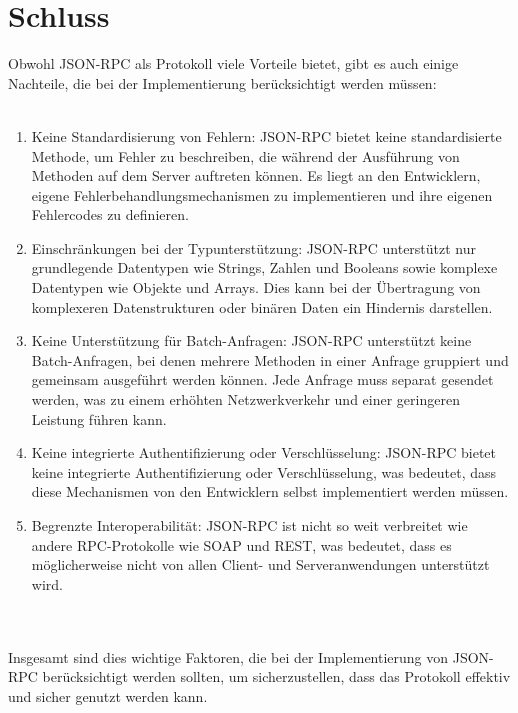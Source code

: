 \documentclass[german,oneside,color]{htldipl}
\begin{document}
\chapter{Schluss}
Obwohl JSON-RPC als Protokoll viele Vorteile bietet, gibt es auch einige Nachteile, die bei der Implementierung berücksichtigt werden müssen:
\\
\\
\begin{enumerate}
    \item Keine Standardisierung von Fehlern: JSON-RPC bietet keine standardisierte Methode, um Fehler zu beschreiben, die während der Ausführung von Methoden auf dem Server auftreten können. Es liegt an den Entwicklern, eigene Fehlerbehandlungsmechanismen zu implementieren und ihre eigenen Fehlercodes zu definieren.
    \item Einschränkungen bei der Typunterstützung: JSON-RPC unterstützt nur grundlegende Datentypen wie Strings, Zahlen und Booleans sowie komplexe Datentypen wie Objekte und Arrays. Dies kann bei der Übertragung von komplexeren Datenstrukturen oder binären Daten ein Hindernis darstellen.
    \item Keine Unterstützung für Batch-Anfragen: JSON-RPC unterstützt keine Batch-Anfragen, bei denen mehrere Methoden in einer Anfrage gruppiert und gemeinsam ausgeführt werden können. Jede Anfrage muss separat gesendet werden, was zu einem erhöhten Netzwerkverkehr und einer geringeren Leistung führen kann.
    \item Keine integrierte Authentifizierung oder Verschlüsselung: JSON-RPC bietet keine integrierte Authentifizierung oder Verschlüsselung, was bedeutet, dass diese Mechanismen von den Entwicklern selbst implementiert werden müssen.
    \item Begrenzte Interoperabilität: JSON-RPC ist nicht so weit verbreitet wie andere RPC-Protokolle wie SOAP und REST, was bedeutet, dass es möglicherweise nicht von allen Client- und Serveranwendungen unterstützt wird.
\end{enumerate}
\\
\\
Insgesamt sind dies wichtige Faktoren, die bei der Implementierung von JSON-RPC berücksichtigt werden sollten, um sicherzustellen, dass das Protokoll effektiv und sicher genutzt werden kann.
\end{document}

